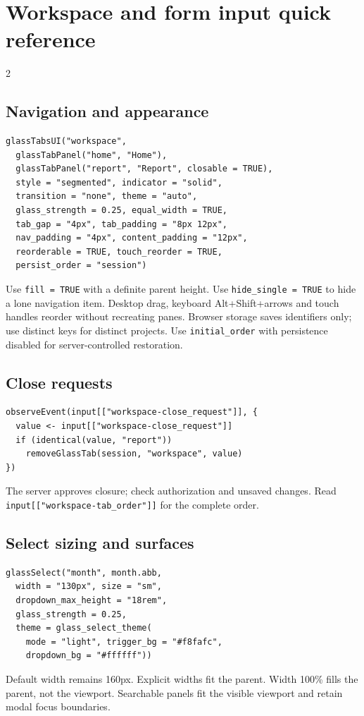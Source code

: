 \documentclass[9pt,a4paper]{article}
\begin{document}
\section*{Workspace and form input quick reference}
\begin{multicols*}{2}
\raggedcolumns
\subsection*{Navigation and appearance}
\begin{verbatim}
glassTabsUI("workspace",
  glassTabPanel("home", "Home"),
  glassTabPanel("report", "Report", closable = TRUE),
  style = "segmented", indicator = "solid",
  transition = "none", theme = "auto",
  glass_strength = 0.25, equal_width = TRUE,
  tab_gap = "4px", tab_padding = "8px 12px",
  nav_padding = "4px", content_padding = "12px",
  reorderable = TRUE, touch_reorder = TRUE,
  persist_order = "session")
\end{verbatim}
Use \verb|fill = TRUE| with a definite parent height. Use
\verb|hide_single = TRUE| to hide a lone navigation item.
Desktop drag, keyboard Alt+Shift+arrows and touch handles reorder without
recreating panes. Browser storage saves identifiers only; use distinct keys
for distinct projects. Use \verb|initial_order| with persistence disabled for
server-controlled restoration.
\subsection*{Close requests}
\begin{verbatim}
observeEvent(input[["workspace-close_request"]], {
  value <- input[["workspace-close_request"]]
  if (identical(value, "report"))
    removeGlassTab(session, "workspace", value)
})
\end{verbatim}
The server approves closure; check authorization and unsaved changes.
Read \verb|input[["workspace-tab_order"]]| for the complete order.
\columnbreak
\subsection*{Select sizing and surfaces}
\begin{verbatim}
glassSelect("month", month.abb,
  width = "130px", size = "sm",
  dropdown_max_height = "18rem",
  glass_strength = 0.25,
  theme = glass_select_theme(
    mode = "light", trigger_bg = "#f8fafc",
    dropdown_bg = "#ffffff"))
\end{verbatim}
Default width remains 160px. Explicit widths fit the parent. Width 100\%
fills the parent, not the viewport. Searchable panels fit the visible
viewport and retain modal focus boundaries.

\end{multicols*}
\end{document}
